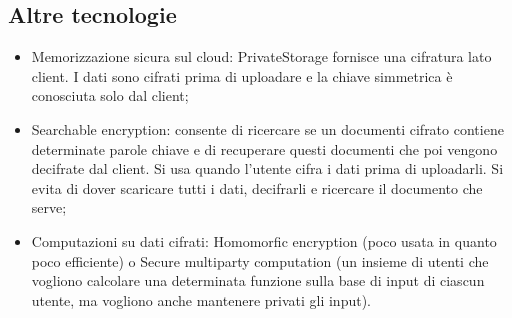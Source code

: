 \subsection{Altre tecnologie}

\begin{itemize}
    \item Memorizzazione sicura sul cloud: PrivateStorage fornisce una cifratura lato client. I dati sono cifrati prima di uploadare e la chiave simmetrica è conosciuta solo dal client;
    \item Searchable encryption: consente di ricercare se un documenti cifrato contiene determinate parole chiave e di recuperare questi documenti che poi vengono decifrate dal client. Si usa quando l'utente cifra i dati prima di uploadarli. Si evita di dover scaricare tutti i dati, decifrarli e ricercare il documento che serve;
    \item Computazioni su dati cifrati: Homomorfic encryption (poco usata in quanto poco efficiente) o Secure multiparty computation (un insieme di utenti che vogliono calcolare una determinata funzione sulla base di input di ciascun utente, ma vogliono anche mantenere privati gli input).
\end{itemize}








